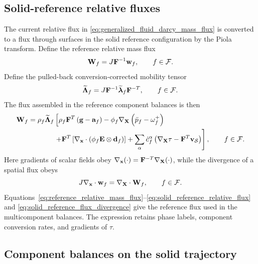 \subsection{Solid-reference relative fluxes}
\label{sec:solid_reference_relative_fluxes}

The current relative flux in \eqref{eq:generalized_fluid_darcy_mass_flux} is
converted to a flux through surfaces in the solid reference configuration by the
Piola transform.  Define the reference relative mass flux
%
\begin{equation}
	\mathbf{W}_f
	=
	J\mathbf{F}^{-1}\mathbf{w}_f,
	\qquad
	f\in\mathcal{F} .
	\label{eq:reference_relative_mass_flux}
\end{equation}
%
Define the pulled-back conversion-corrected mobility tensor
%
\begin{equation}
	\widetilde{\boldsymbol{\Lambda}}_f
	=
	J\mathbf{F}^{-1}
	\widetilde{\boldsymbol{\lambda}}_f
	\mathbf{F}^{-T},
	\qquad
	f\in\mathcal{F} .
	\label{eq:pulled_back_modified_permeability}
\end{equation}
%
The flux assembled in the reference component balances is then
%
\begin{align}
	\mbf W_f
	= & \; \rho_f\widetilde{\bs\Lambda}_f
	\left[
		\rho_f\mbf F^T\left(\mbf g-\mbf a_f\right)
		-\phi_f\nabla_{\mbf X}
		\left(
			\bar p_f-\omega_f^+
		\right)
		\right.
		\notag \\
	& \phantom{\;\rho_f\widetilde{\bs\Lambda}_f}
		\left.
		+\mbf F^T
		\left[
			\nabla_{\mbf x}\cdot
			\left(
				\phi_f\mbf E\otimes\mbf d_f
			\right)
		\right]
		+\sum_\alpha\dot{c}_f^\alpha
	\left(\nabla_{\mbf X}\tau-\mbf F^T\mbf v_{\mc S}\right)
	\right],
	\qquad
	f\in\mc F .
	\label{eq:solid_reference_relative_flux}
\end{align}
%
Here gradients of scalar fields obey
$\nabla_{\mathbf{x}}(\cdot)=\mathbf{F}^{-T}\nabla_{\mathbf{X}}(\cdot)$, while the
divergence of a spatial flux obeys
%
\begin{equation}
	J\nabla_{\mathbf{x}}\cdot\mathbf{w}_f
	=
	\nabla_{\mathbf{X}}\cdot
	\mathbf{W}_f,
	\qquad
	f\in\mathcal{F} .
	\label{eq:solid_reference_flux_divergence}
\end{equation}
%
Equations~\eqref{eq:reference_relative_mass_flux}--\eqref{eq:solid_reference_relative_flux}
and \eqref{eq:solid_reference_flux_divergence} give the reference flux used in
the multicomponent balances.  The expression retains phase labels, component
conversion rates, and gradients of \(\tau\).

\subsection{Component balances on the solid trajectory}
\label{sec:solid_reference_component_balances}

